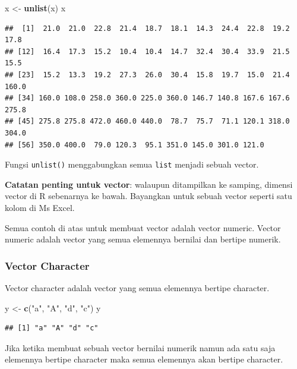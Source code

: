 \documentclass[]{book}
\newenvironment{Shaded}{\begin{snugshade}}{\end{snugshade}}
\newcommand{\KeywordTok}[1]{\textcolor[rgb]{0.13,0.29,0.53}{\textbf{#1}}}
\newcommand{\NormalTok}[1]{#1}
\newcommand{\StringTok}[1]{\textcolor[rgb]{0.31,0.60,0.02}{#1}}
\begin{document}
\begin{Shaded}
\begin{Highlighting}[]
\NormalTok{x <-}\StringTok{ }\KeywordTok{unlist}\NormalTok{(x)}
\NormalTok{x}
\end{Highlighting}
\end{Shaded}

\begin{verbatim}
##  [1]  21.0  21.0  22.8  21.4  18.7  18.1  14.3  24.4  22.8  19.2  17.8
## [12]  16.4  17.3  15.2  10.4  10.4  14.7  32.4  30.4  33.9  21.5  15.5
## [23]  15.2  13.3  19.2  27.3  26.0  30.4  15.8  19.7  15.0  21.4 160.0
## [34] 160.0 108.0 258.0 360.0 225.0 360.0 146.7 140.8 167.6 167.6 275.8
## [45] 275.8 275.8 472.0 460.0 440.0  78.7  75.7  71.1 120.1 318.0 304.0
## [56] 350.0 400.0  79.0 120.3  95.1 351.0 145.0 301.0 121.0
\end{verbatim}

Fungsi \texttt{unlist()} menggabungkan semua \texttt{list} menjadi sebuah vector.

\textbf{Catatan penting untuk vector}: walaupun ditampilkan ke samping, dimensi vector di R sebenarnya ke bawah. Bayangkan untuk sebuah vector seperti satu kolom di Ms Excel.

Semua contoh di atas untuk membuat vector adalah vector numeric. Vector numeric adalah vector yang semua elemennya bernilai dan bertipe numerik.

\hypertarget{vector-character}{%
\subsubsection{Vector Character}\label{vector-character}}

Vector character adalah vector yang semua elemennya bertipe character.

\begin{Shaded}
\begin{Highlighting}[]
\NormalTok{y <-}\StringTok{ }\KeywordTok{c}\NormalTok{(}\StringTok{"a"}\NormalTok{, }\StringTok{"A"}\NormalTok{, }\StringTok{"d"}\NormalTok{, }\StringTok{"c"}\NormalTok{)}
\NormalTok{y}
\end{Highlighting}
\end{Shaded}

\begin{verbatim}
## [1] "a" "A" "d" "c"
\end{verbatim}

Jika ketika membuat sebuah vector bernilai numerik namun ada satu saja elemennya bertipe character maka semua elemennya akan bertipe character.
\end{document}

